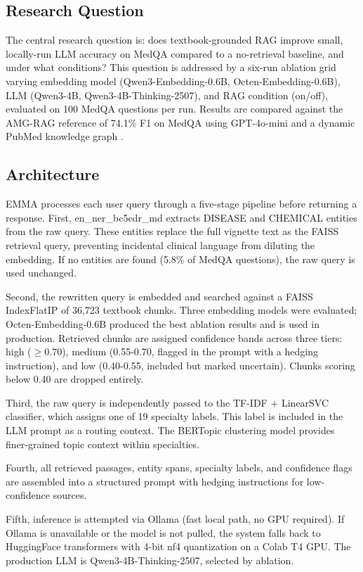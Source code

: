 \subsection{Research Question}
The central research question is: does textbook-grounded RAG improve small, locally-run LLM accuracy on MedQA compared to a no-retrieval baseline, and under what conditions? This question is addressed by a six-run ablation grid varying embedding model (Qwen3-Embedding-0.6B, Octen-Embedding-0.6B), LLM (Qwen3-4B, Qwen3-4B-Thinking-2507), and RAG condition (on/off), evaluated on 100 MedQA questions per run. Results are compared against the AMG-RAG reference of 74.1\% F1 on MedQA using GPT-4o-mini and a dynamic PubMed knowledge graph \cite{rezaei2025}.

\subsection{Architecture}
EMMA processes each user query through a five-stage pipeline before returning a response. First, en\_ner\_bc5cdr\_md extracts DISEASE and CHEMICAL entities from the raw query. These entities replace the full vignette text as the FAISS retrieval query, preventing incidental clinical language from diluting the embedding. If no entities are found (5.8\% of MedQA questions), the raw query is used unchanged.

Second, the rewritten query is embedded and searched against a FAISS IndexFlatIP of 36,723 textbook chunks. Three embedding models were evaluated; Octen-Embedding-0.6B produced the best ablation results and is used in production. Retrieved chunks are assigned confidence bands across three tiers: high ($\ge 0.70$), medium (0.55-0.70, flagged in the prompt with a hedging instruction), and low (0.40-0.55, included but marked uncertain). Chunks scoring below 0.40 are dropped entirely.

Third, the raw query is independently passed to the TF-IDF + LinearSVC classifier, which assigns one of 19 specialty labels. This label is included in the LLM prompt as a routing context. The BERTopic clustering model provides finer-grained topic context within specialties.

Fourth, all retrieved passages, entity spans, specialty labels, and confidence flags are assembled into a structured prompt with hedging instructions for low-confidence sources.

Fifth, inference is attempted via Ollama (fast local path, no GPU required). If Ollama is unavailable or the model is not pulled, the system falls back to HuggingFace transformers with 4-bit nf4 quantization on a Colab T4 GPU. The production LLM is Qwen3-4B-Thinking-2507, selected by ablation.

